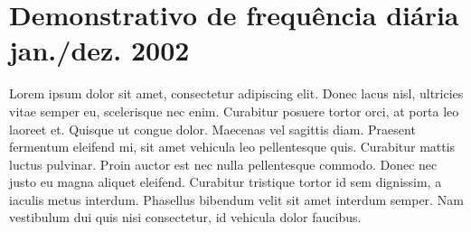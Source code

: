 
{\let\clearpage\relax \chapter{\textbf{Demonstrativo de frequência diária jan./dez. 2002}}}

Lorem ipsum dolor sit amet, consectetur adipiscing elit. Donec lacus nisl, ultricies vitae semper eu, scelerisque nec enim. Curabitur posuere tortor orci, at porta leo laoreet et. Quisque ut congue dolor. Maecenas vel sagittis diam. Praesent fermentum eleifend mi, sit amet vehicula leo pellentesque quis. Curabitur mattis luctus pulvinar. Proin auctor est nec nulla pellentesque commodo. Donec nec justo eu magna aliquet eleifend. Curabitur tristique tortor id sem dignissim, a iaculis metus interdum. Phasellus bibendum velit sit amet interdum semper. Nam vestibulum dui quis nisi consectetur, id vehicula dolor faucibus.

